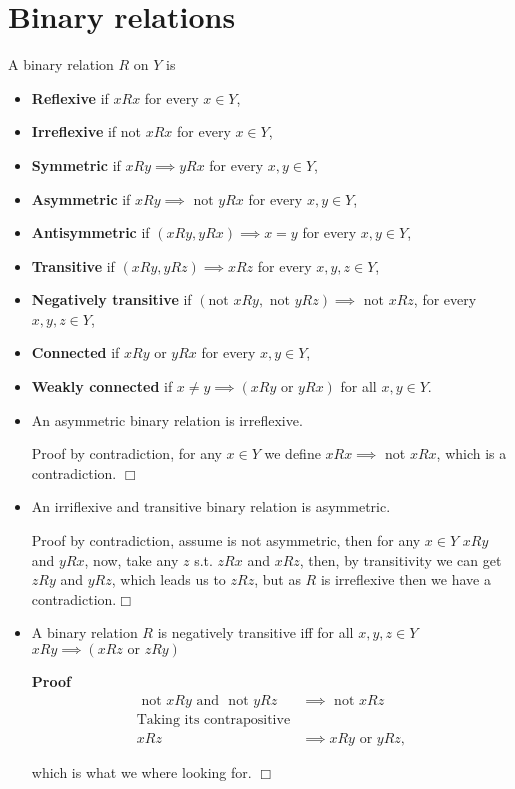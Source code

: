 \documentclass{article}
\theoremstyle{definition}
\def\tor{\text{ or }}
\def\tand{\text{ and }}
\def\tnot{\text{ not }}
\begin{document}
\section{Binary relations}
 A binary relation $R$ on $Y$ is
\begin{itemize}
\item {\bf Reflexive} if $xRx$ for every $x\in Y$,
\item {\bf Irreflexive} if not $xRx$ for every $x\in Y$,
\item {\bf Symmetric} if $xRy\implies yRx$ for every $x,y\in Y$,
\item {\bf Asymmetric} if $xRy\implies\text{ not }yRx$ for every $x,y \in Y$,
\item {\bf Antisymmetric} if $(xRy,yRx)\implies x=y$ for every $x,y\in Y$,
\item {\bf Transitive} if $(xRy,yRz)\implies xRz$ for every $x,y,z\in Y$,
\item {\bf Negatively transitive} if $(\text{not }xRy,\text{ not }yRz)\implies\text{ not }xRz$, for every $x,y,z\in Y$,
\item {\bf Connected} if $xRy$ or $yRx$ for every $x,y\in Y$,
\item {\bf Weakly connected} if $x\not=y\implies (xRy\text{ or }yRx)$ for all $x,y\in Y$.
\end{itemize}


\begin{itemize}
\item An asymmetric binary relation is irreflexive.


Proof by contradiction, for any $x\in Y$ we define $xRx\implies$ not $xRx$, which is a contradiction. $\Box$

\item An irriflexive and transitive binary relation is asymmetric.


Proof by contradiction, assume is not asymmetric, then for any $x\in Y$ $xRy$ and $yRx$,
now, take any $z$ s.t. $zRx$ and $xRz$, then, by transitivity we can get $zRy$ and $yRz$,
which leads us to $zRz$, but as $R$ is irreflexive then we have a contradiction.$\Box$

\item A binary relation  $R$ is negatively transitive iff for all $x,y,z\in Y$ $xRy\implies (xRz\text{ or }zRy)$

{\bf Proof}
\begin{align*}
\tnot xRy\tand \tnot yRz &\implies \tnot xRz \\
\text{Taking its contrapositive}\\
xRz&\implies xRy\tor yRz,
\end{align*}

which is what we where looking for. $\Box$
\end{itemize}
\end{document}
